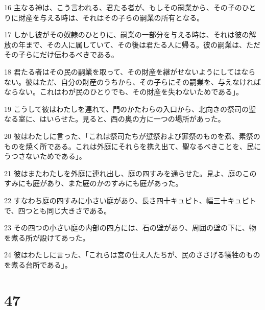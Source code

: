 \par 16 主なる神は、こう言われる、君たる者が、もしその嗣業から、その子のひとりに財産を与える時は、それはその子らの嗣業の所有となる。
\par 17 しかし彼がその奴隷のひとりに、嗣業の一部分を与える時は、それは彼の解放の年まで、その人に属していて、その後は君たる人に帰る。彼の嗣業は、ただその子らにだけ伝わるべきである。
\par 18 君たる者はその民の嗣業を取って、その財産を継がせないようにしてはならない。彼はただ、自分の財産のうちから、その子らにその嗣業を、与えなければならない。これはわが民のひとりでも、その財産を失わないためである」。
\par 19 こうして彼はわたしを連れて、門のかたわらの入口から、北向きの祭司の聖なる室に、はいらせた。見ると、西の奥の方に一つの場所があった。
\par 20 彼はわたしに言った、「これは祭司たちが愆祭および罪祭のものを煮、素祭のものを焼く所である。これは外庭にそれらを携え出て、聖なるべきことを、民にうつさないためである」。
\par 21 彼はまたわたしを外庭に連れ出し、庭の四すみを通らせた。見よ、庭のこのすみにも庭があり、また庭のかのすみにも庭があった。
\par 22 すなわち庭の四すみに小さい庭があり、長さ四十キュビト、幅三十キュビトで、四つとも同じ大きさである。
\par 23 その四つの小さい庭の内部の四方には、石の壁があり、周囲の壁の下に、物を煮る所が設けてあった。
\par 24 彼はわたしに言った、「これらは宮の仕え人たちが、民のささげる犠牲のものを煮る台所である」。

\chapter{47}

